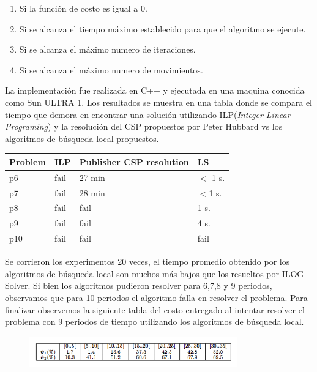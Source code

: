 \documentclass[spanish, fleqn]{article}
\begin{document}
\begin{itemize}
\begin{enumerate}
	\item Si la función de costo es igual a 0.
	\item Si se alcanza el tiempo máximo establecido para que el algoritmo se ejecute.
	\item Si se alcanza el máximo numero de iteraciones.
	\item Si se alcanza el máximo numero de movimientos.

\end{enumerate}

La implementación fue realizada en C++ y ejecutada en una maquina conocida como Sun ULTRA 1. Los resultados se muestra en una tabla donde se compara el tiempo que demora en encontrar una solución utilizando ILP(\textit{Integer Linear Programing}) y la resolución del CSP propuestos por Peter Hubbard vs los algoritmos de búsqueda local propuestos.


\newpage


\begin{table}[h!]
\centering
   \begin{tabular}{|l|l|l|l|}
    \hline
    Problem & ILP  & Publisher CSP resolution & LS     \\ \hline
    p6      & fail & 27 min                   & $<$ 1 s. \\
    p7      & fail & 28 min                   & $<$1 s. \\
    p8      & fail & fail                     & 1 s.   \\
    p9      & fail & fail                     & 4 s.   \\
    p10     & fail & fail                     & fail   \\ \hline
    \end{tabular}
\end{table}

Se corrieron los experimentos 20 veces, el tiempo promedio obtenido por los algoritmos de búsqueda local son muchos más bajos que los resueltos por ILOG Solver. Si bien los algoritmos pudieron resolver para 6,7,8 y 9 periodos, observamos que para 10 periodos el algoritmo falla en resolver el problema. Para finalizar observemos la siguiente tabla del costo entregado al intentar resolver el problema con 9 periodos de tiempo utilizando los algoritmos de  búsqueda local.


\begin{figure}[!h]
  \centering
    \includegraphics[width=0.8\textwidth]{4}
  \label{fig:DiagramaBarra5}
\end{figure}


\end{itemize}
\end{document}
